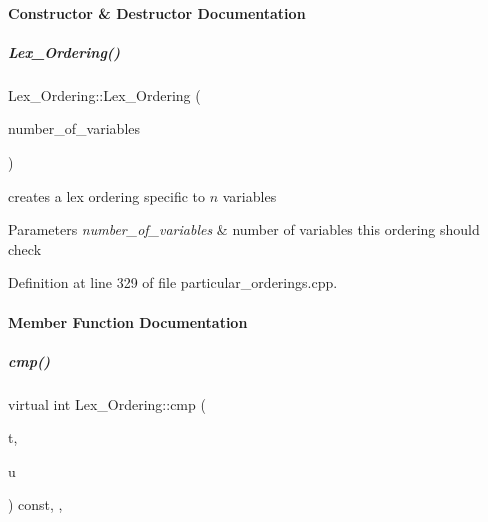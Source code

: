 \paragraph{Constructor \& Destructor Documentation}
\mbox{\label{group__orderinggroup_a35968aecc4009c0d15bfd357ccf74a5f}} 
\subparagraph{\texorpdfstring{Lex\+\_\+\+Ordering()}{Lex\_Ordering()}}
{\footnotesize\ttfamily Lex\+\_\+\+Ordering\+::\+Lex\+\_\+\+Ordering (\begin{DoxyParamCaption}\item[{N\+V\+A\+R\+\_\+\+T\+Y\+PE}]{number\+\_\+of\+\_\+variables }\end{DoxyParamCaption})}



creates a lex ordering specific to $n$ variables 


\begin{DoxyParams}{Parameters}
{\em number\+\_\+of\+\_\+variables} & number of variables this ordering should check \\
\hline
\end{DoxyParams}


Definition at line 329 of file particular\+\_\+orderings.\+cpp.



\paragraph{Member Function Documentation}
\mbox{\label{group__orderinggroup_a44d74f3b1e29abde22334f455979a67f}} 
\subparagraph{\texorpdfstring{cmp()}{cmp()}}
{\footnotesize\ttfamily virtual int Lex\+\_\+\+Ordering\+::cmp (\begin{DoxyParamCaption}\item[{const \hyperlink{group__polygroup_class_monomial}{Monomial} \&}]{t,  }\item[{const \hyperlink{group__polygroup_class_monomial}{Monomial} \&}]{u }\end{DoxyParamCaption}) const\hspace{0.3cm}{\ttfamily [inline]}, {\ttfamily [override]}, {\ttfamily [virtual]}}



